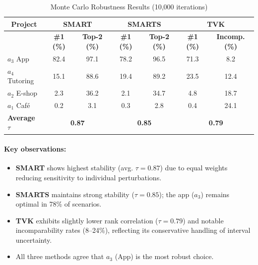 \documentclass[conference]{IEEEtran}
\begin{document}
\begin{table}[H]
	\centering
	\caption{Monte Carlo Robustness Results (10,000 iterations)}
	\label{tab:monte_carlo_final}
	
	\footnotesize
	\setlength{\tabcolsep}{0.4pt}
	\renewcommand{\arraystretch}{1.5}
	
	\begin{tabular}{|l|c|c|c|c|c|c|}
		\hline
		\multicolumn{1}{|c|}{\textbf{Project}} & 
		\multicolumn{2}{c|}{\textbf{SMART}} & 
		\multicolumn{2}{c|}{\textbf{SMARTS}} & 
		\multicolumn{2}{c|}{\textbf{TVK}} \\
		\hline
		& \textbf{\#1 (\%)} & \textbf{Top-2 (\%)} & 
		\textbf{\#1 (\%)} & \textbf{Top-2 (\%)} & 
		\textbf{\#1 (\%)} & \textbf{Incomp. (\%)} \\
		\hline
		$a_3$ App & 82.4 & 97.1 & 78.2 & 96.5 & 71.3 & 8.2 \\
		\hline
		$a_4$ Tutoring & 15.1 & 88.6 & 19.4 & 89.2 & 23.5 & 12.4 \\
		\hline
		$a_2$ E-shop & 2.3 & 36.2 & 2.1 & 34.7 & 4.8 & 18.7 \\
		\hline
		$a_1$ Café & 0.2 & 3.1 & 0.3 & 2.8 & 0.4 & 24.1 \\
		\hline
		\textbf{Average $\tau$} & 
		\multicolumn{2}{c|}{\textbf{0.87}} & 
		\multicolumn{2}{c|}{\textbf{0.85}} & 
		\multicolumn{2}{c|}{\textbf{0.79}} \\
		\hline
	\end{tabular}
\end{table}
	

\paragraph{Key observations:}
\begin{itemize}
	\item \textbf{SMART} shows highest stability (avg. $\tau = 0.87$) due to equal weights reducing sensitivity to individual perturbations.
	\item \textbf{SMARTS} maintains strong stability ($\tau = 0.85$); the app ($a_3$) remains optimal in 78\% of scenarios.
	\item \textbf{TVK} exhibits slightly lower rank correlation ($\tau = 0.79$) and notable incomparability rates (8--24\%), reflecting its conservative handling of interval uncertainty.
	\item All three methods agree that $a_3$ (App) is the most robust choice.
\end{itemize}
\end{document}
